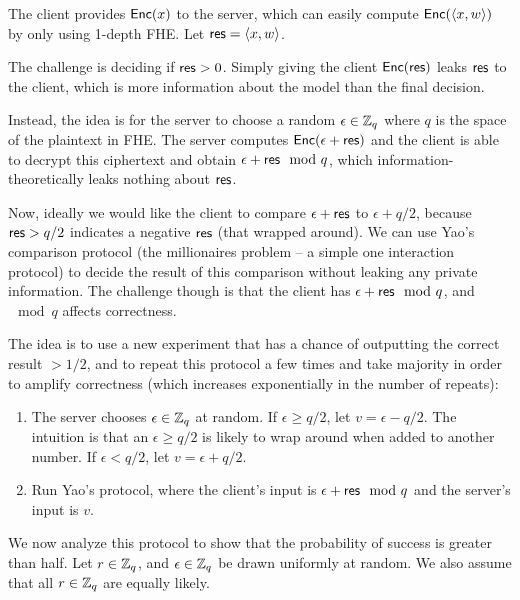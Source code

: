 \documentclass[11pt]{article}
\begin{document}
The client provides $\mathsf{Enc}(x)$ to the server, which can easily compute
$\mathsf{Enc}(\langle x, w \rangle)$ by only using 1-depth FHE. Let $\mathsf{res} = \langle x,
w \rangle$.

The challenge is deciding if $\mathsf{res} > 0$. Simply giving the client $\mathsf{Enc}(\mathsf{res})$ leaks $\mathsf{res}$ to the client, which is more information about the model than the final decision.

Instead, the idea is for the server to choose a random $\epsilon \in {\mathbb Z}_q$ where $q$ is the space of the plaintext in FHE. The server computes $\mathsf{Enc}(\epsilon + \mathsf{res})$ and the client is able to decrypt this ciphertext and obtain $\epsilon + \mathsf{res} \mod q$, which information-theoretically leaks nothing about $\mathsf{res}$.

Now, ideally we would like the client to compare $\epsilon + \mathsf{res}$ to $\epsilon + q/2$, because $\mathsf{res} > q/2$ indicates a negative $\mathsf{res}$ (that wrapped around). We can use Yao's comparison protocol (the millionaires problem -- a simple one interaction protocol) to decide the result of this comparison without leaking any private information. The challenge though is that the client has $\epsilon + \mathsf{res} \mod q$, and $\mod q$ affects correctness.

The idea is to use a new experiment that has a chance of outputting the correct result $>1/2$, and to repeat this protocol a few times and take majority in order to amplify correctness (which increases exponentially in the number of repeats):

\newcommand{\eps}{\epsilon}

\begin{enumerate}
\item
    The server chooses $\epsilon \in {\mathbb Z}_q$ at random. If $\epsilon \geq q/2$,
    let $v = \eps - q/2$. The intuition is that an $\eps \geq q/2$ is likely to
    wrap around when added to another number. If $\eps < q/2$, let $v = \eps +
    q/2$.
\item Run Yao's protocol, where the client's input is $\eps + \res \mod q$ and the server's input is $v$.
\end{enumerate}

We now analyze this protocol to show that the probability of success is greater
than half. Let $r \in {\mathbb Z}_q$, and $\epsilon \in {\mathbb Z}_q$ be drawn uniformly at
random. We also assume that all $r \in {\mathbb Z}_q$ are equally likely.
\end{document}
